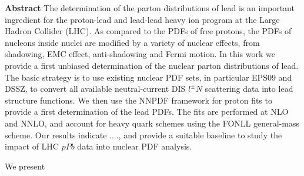 \documentclass[11pt,a4paper]{article}
\begin{document}
\vspace{0.1cm}

\begin{center}
{\bf \large Abstract}
The determination of the parton distributions of lead is
an important ingredient for the proton-lead and lead-lead
heavy ion program at the Large Hadron Collider (LHC).
%
As compared to the PDFs of free protons, the PDFs of nucleons
inside nuclei are modified by a variety of nuclear effects,
from shadowing, EMC effect, anti-shadowing and Fermi motion.
%
In this work we provide a first unbiased determination of
the nuclear parton distributions of lead.
%
The basic strategy is to use existing nuclear PDF sets,
in particular EPS09 and DSSZ, to convert all available neutral-current
DIS $l^{\pm}N$ scattering data into lead structure functions.
%
We then use the NNPDF framework for proton fits to provide
a first determination of the lead PDFs.
%
The fits are performed at NLO and NNLO, and account for heavy quark
schemes using the FONLL general-mass scheme.
%
Our results indicate ...., and provide a suitable baseline to study the
impact of LHC $pPb$ data into nuclear PDF analysis.

\end{center}


We present
%

\clearpage

\tableofcontents

\clearpage












\end{document}

